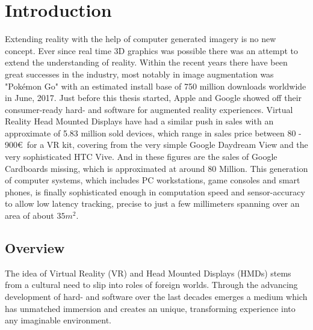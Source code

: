 %
\chapter{Introduction}
\label{sec:intro}


Extending reality with the help of computer generated imagery is no new 
concept. Ever since real time 3D graphics was possible there was an attempt to 
extend the understanding of reality. Within the recent years there have been 
great successes in the industry, most notably in image augmentation was 
"Pokémon Go" with an estimated install base of 750 million downloads 
worldwide in June, 2017. \cite{appannie:2017}  Just before this thesis 
started, Apple and Google showed off their consumer-ready hard- and software 
for augmented reality experiences. 
\newline
Virtual Reality Head Mounted Displays have had a similar push in sales with an 
approximate of 5.83 million sold devices, which range in sales price between 
80 - 900€ for a VR kit, covering from the very simple Google Daydream View and 
the very sophisticated HTC Vive. \cite{erguerel:2017} And in these figures are 
the sales of Google Cardboards missing, which is approximated at around 80  
Million. 
\newline
This generation of computer systems, which includes PC workstations, game 
consoles and smart phones, is finally sophisticated enough in computation speed 
and sensor-accuracy to allow low latency tracking, precise to just a few 
millimeters spanning over an area of about $35m^2$. 

\section{Overview}
\label{sec:intro:outline}

The idea of Virtual Reality (VR) and Head Mounted Displays (HMDs) stems from a 
cultural need to slip into roles of foreign worlds. Through the advancing 
development of hard- and software over the last decades emerges a medium which 
has unmatched immersion and creates an unique, transforming experience into any 
imaginable environment.

